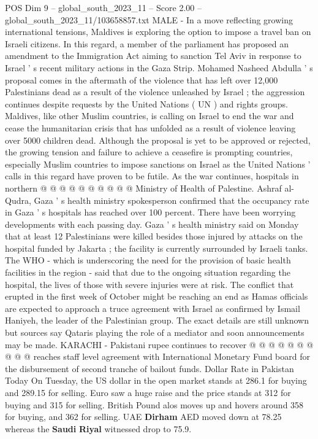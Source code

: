 \begin{textsample}{POS Dim 9 – global\_south\_2023\_11 – Score 2.00 – global\_south\_2023\_11/103658857.txt}  \label{ex:f9_pos_129}
MALE - In a move reflecting growing international tensions, Maldives is exploring the option to impose a travel ban on Israeli citizens.
In this regard, a member of the parliament has proposed an amendment to the Immigration Act aiming to sanction Tel Aviv in response to Israel ' s recent military actions in the Gaza Strip.
Mohamed Nasheed Abdulla ' s proposal comes in the aftermath of the violence that has left over 12,000 Palestinians dead as a result of the violence unleashed by Israel ; the aggression continues despite requests by the United Nations ( UN ) and rights groups.
Maldives, like other Muslim countries, is calling on Israel to end the war and cease the humanitarian crisis that has unfolded as a result of violence leaving over 5000 children dead.
Although the proposal is yet to be approved or rejected, the growing tension and failure to achieve a ceasefire is prompting countries, especially Muslim countries to impose sanctions on Israel as the United Nations ' calls in this regard have proven to be futile.
As the war continues, hospitals in northern @ @ @ @ @ @ @ @ @ @ Ministry of Health of Palestine.
Ashraf al-Qudra, Gaza ' s health ministry spokesperson confirmed that the occupancy rate in Gaza ' s hospitals has reached over 100 percent.
There have been worrying developments with each passing day.
Gaza ' s health ministry said on Monday that at least 12 Palestinians were killed besides those injured by attacks on the hospital funded by Jakarta ; the facility is currently surrounded by Israeli tanks.
The WHO - which is underscoring the need for the provision of basic health facilities in the region - said that due to the ongoing situation regarding the hospital, the lives of those with severe injuries were at risk.
The conflict that erupted in the first week of October might be reaching an end as Hamas officials are expected to approach a truce agreement with Israel as confirmed by Ismail Haniyeh, the leader of the Palestinian group.
The exact details are still unknown but sources say Qataris playing the role of a mediator and soon announcements may be made.
KARACHI - Pakistani rupee continues to recover @ @ @ @ @ @ @ @ @ @ reaches staff level agreement with International Monetary Fund board for the disbursement of second tranche of bailout funds.
Dollar Rate in Pakistan Today On Tuesday, the US dollar in the open market stands at 286.1 for buying and 289.15 for selling.
Euro saw a huge raise and the price stands at 312 for buying and 315 for selling.
British Pound alos moves up and hovers around 358 for buying, and 362 for selling.
UAE \textbf{Dirham} AED moved down at 78.25 whereas the \textbf{Saudi} \textbf{Riyal} witnessed drop to 75.9.

\end{textsample}
